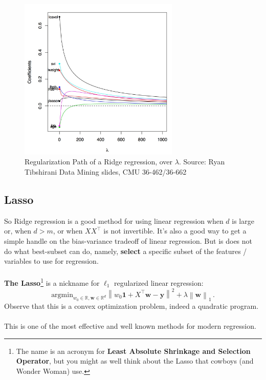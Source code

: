 \documentclass[11pt]{article}
\newcommand{\norm}[1]{\left\| #1\right\|}
\newcommand{\R}{\ensuremath{\mathbb{R}}}
\newcommand{\Tr}{\ensuremath{\top}}
\newcommand{\V}[1]{\mathbf{#1}}
\begin{document}
\begin{figure}[H]
      \centering
      \includegraphics[width=3in]{ridge_path.jpeg}
      \caption{Regularization Path of a Ridge regression, over $\lambda$.
      Source: Ryan Tibshirani Data Mining slides, CMU 36-462/36-662 }
    \end{figure}


\subsection{Lasso}


So Ridge regression is a good method for using linear regression when $d$ is large or,
when $d>m$, or when
$XX^\Tr$ is not invertible. It's also a good way to get a simple handle on the
bias-variance tradeoff of linear regression. But is does not do what best-subset
can do, namely, {\bf select}
a specific subset of the features / variables  to use for regression.
\\~\\
{\bf The Lasso}\footnote{The name is an acronym for {\bf Least Absolute
  Shrinkage and Selection Operator}, but
you might as well think about the Lasso that cowboys (and Wonder Woman) use.}  is a nickname for $\ell_1$ regularized linear regression:
\[
      \text{argmin}_{w_0\in\R,\V{w}\in\R^{d}} \norm{ w_0\mathbf{1} + X^\Tr\V{w} -\V{y}  }^2
      +  \lambda \norm{\V{w}}_1\,.
    \]
    Observe that this is a convex optimization problem, indeed a quadratic
    program.
\\~\\
This is 
one of the most effective and well known methods for modern regression. 
\end{document}
